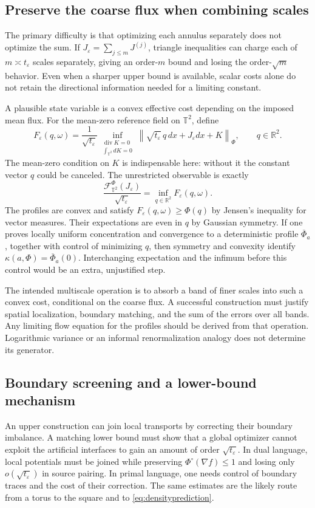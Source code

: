 \documentclass[11pt]{article}
\theoremstyle{definition}
\newcommand{\R}{\mathbb R}
\newcommand{\T}{\mathbb T}
\newcommand{\diver}{\operatorname{div}}
\newcommand{\cF}{\mathcal F}
\begin{document}
\subsection{Preserve the coarse flux when combining scales}
The primary difficulty is that optimizing each annulus separately does
not optimize the sum. If $J_\varepsilon=\sum_{j\leq m}J^{(j)}$, triangle
inequalities can charge each of $m\asymp t_\varepsilon$ scales
separately, giving an order-$m$ bound and losing the order-$\sqrt m$
behavior. Even when a sharper upper bound is available, scalar costs
alone do not retain the directional information needed for a limiting
constant.

A plausible state variable is a convex effective cost depending on the
imposed mean flux. For the mean-zero reference field on $\T^2$, define
\begin{equation}\label{eq:profile}
  F_\varepsilon(q,\omega)
  =\frac1{\sqrt{t_\varepsilon}}
      \inf_{\substack{\diver K=0\\\int_{\T^2}dK=0}}
       \left\|\sqrt{t_\varepsilon}\,q\,dx
                      +J_\varepsilon dx+K\right\|_\Phi,
  \qquad q\in\R^2.
\end{equation}
The mean-zero condition on $K$ is indispensable here: without it the
constant vector $q$ could be canceled. The unrestricted observable is
exactly
\[
  \frac{\cF_{\T^2}^\Phi(J_\varepsilon)}{\sqrt{t_\varepsilon}}
  =\inf_{q\in\R^2}F_\varepsilon(q,\omega).
\]
The profiles are convex and satisfy
$F_\varepsilon(q,\omega)\geq\Phi(q)$ by Jensen's inequality for vector
measures. Their expectations are even in $q$ by Gaussian symmetry.
If one proves locally uniform concentration and convergence to a
deterministic profile $\overline\Phi_a$, together with control of
minimizing $q$, then symmetry and convexity identify
$\kappa(a,\Phi)=\overline\Phi_a(0)$. Interchanging expectation and the
infimum before this control would be an extra, unjustified step.

The intended multiscale operation is to absorb a band of finer scales
into such a convex cost, conditional on the coarse flux. A successful
construction must justify spatial localization, boundary matching, and
the sum of the errors over all bands. Any limiting flow equation for
the profiles should be derived from that operation. Logarithmic
variance or an informal renormalization analogy does not determine its
generator.

\subsection{Boundary screening and a lower-bound mechanism}
An upper construction can join local transports by correcting their
boundary imbalance. A matching lower bound must show that a global
optimizer cannot exploit the artificial interfaces to gain an amount
of order $\sqrt{t_\varepsilon}$. In dual language, local potentials
must be joined while preserving $\Phi^\circ(\nabla f)\leq1$ and losing
only $o(\sqrt{t_\varepsilon})$ in source pairing. In primal language,
one needs control of boundary traces and the cost of their correction.
The same estimates are the likely route from a torus to the square
and to \eqref{eq:densityprediction}.
\end{document}
